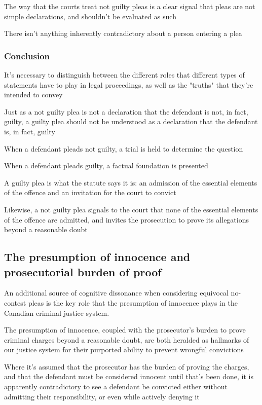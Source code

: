 The way that the courts treat not guilty pleas is a clear signal that pleas are not simple declarations, and shouldn't be evaluated as such

There isn't anything inherently contradictory about a person entering a plea

\subsubsection{Conclusion}

It's necessary to distinguish between the different roles that different types of statements have to play in legal proceedings, as well as the "truths" that they're intended to convey

Just as a not guilty plea is not a declaration that the defendant is not, in fact, guilty, a guilty plea should not be understood as a declaration that the defendant is, in fact, guilty

When a defendant pleads not guilty, a trial is held to determine the question

When a defendant pleads guilty, a factual foundation is presented

A guilty plea is what the statute says it is: an admission of the essential elements of the offence and an invitation for the court to convict

Likewise, a not guilty plea signals to the court that none of the essential elements of the offence are admitted, and invites the prosecution to prove its allegations beyond a reasonable doubt

\subsection{The presumption of innocence and prosecutorial burden of proof}

An additional source of cognitive dissonance when considering equivocal no-contest pleas is the key role that the presumption of innocence plays in the Canadian criminal justice system.

The presumption of innocence, coupled with the prosecutor's burden to prove criminal charges beyond a reasonable doubt, are both heralded as hallmarks of our justice system for their purported ability to prevent wrongful convictions

Where it's assumed that the prosecutor has the burden of proving the charges, and that the defendant must be considered innocent until that's been done, it is apparently contradictory to see a defendant be convicted either without admitting their responsibility, or even while actively denying it

